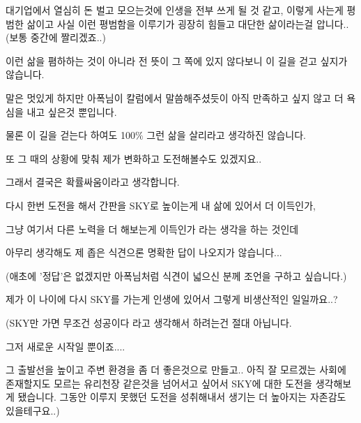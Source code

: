 \begin{enumerate}
    대기업에서 열심히 돈 벌고 모으는것에 인생을 전부 쓰게 될 것 같고, 이렇게 사는게 평범한 삶이고 사실 이런 평범함을 이루기가 굉장히 힘들고 대단한 삶이라는걸 압니다..(보통 중간에 짤리겠죠..)
    \vspace{5mm}
    
    이런 삶을 폄하하는 것이 아니라 전 뜻이 그 쪽에 있지 않다보니 이 길을 걷고 싶지가 않습니다.
    \vspace{5mm}
    
    말은 멋있게 하지만 아폭님이 칼럼에서 말씀해주셨듯이 아직 만족하고 싶지 않고 더 욕심을 내고 싶은것 뿐입니다.
    \vspace{5mm}
    
    물론 이 길을 걷는다 하여도 100$\%$ 그런 삶을 살리라고 생각하진 않습니다.
    \vspace{5mm}
    
    또 그 때의 상황에 맞춰 제가 변화하고 도전해볼수도 있겠지요..
    \vspace{5mm}
    
    그래서 결국은 확률싸움이라고 생각합니다.
    \vspace{5mm}
    
    다시 한번 도전을 해서 간판을 SKY로 높이는게 내 삶에 있어서 더 이득인가,
    \vspace{5mm}
    
    그냥 여기서 다른 노력을 더 해보는게 이득인가 라는 생각을 하는 것인데
    \vspace{5mm}
    
    아무리 생각해도 제 좁은 식견으론 명확한 답이 나오지가 않습니다...
    \vspace{5mm}
    
    (애초에 '정답'은 없겠지만 아폭님처럼 식견이 넓으신 분께 조언을 구하고 싶습니다.)
    \vspace{5mm}
    
    제가 이 나이에 다시 SKY를 가는게 인생에 있어서 그렇게 비생산적인 일일까요..?
    \vspace{5mm}
    
    (SKY만 가면 무조건 성공이다 라고 생각해서 하려는건 절대 아닙니다.
    \vspace{5mm}
    
    그저 새로운 시작일 뿐이죠....
    \vspace{5mm}
    
    그 출발선을 높이고 주변 환경을 좀 더 좋은것으로 만들고.. 아직 잘 모르겠는 사회에 존재할지도 모르는 유리천장 같은것을 넘어서고 싶어서 SKY에 대한 도전을 생각해보게 됐습니다. 그동안 이루지 못했던 도전을 성취해내서 생기는 더 높아지는 자존감도 있을테구요..)
    \vspace{5mm}
    

\end{enumerate}
